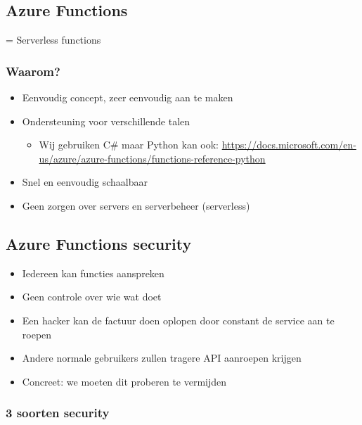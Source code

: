 \documentclass{article}
\begin{document}
\subsection{Azure Functions}
= Serverless functions 

\subsubsection{Waarom?}
\begin{itemize}
    \item Eenvoudig concept, zeer eenvoudig aan te maken
    \item Ondersteuning voor verschillende talen
    \begin{itemize}
        \item Wij gebruiken C\# maar Python kan ook: \url{https://docs.microsoft.com/en-us/azure/azure-functions/functions-reference-python}
    \end{itemize}
    \item Snel en eenvoudig schaalbaar
    \item Geen zorgen over servers en serverbeheer (serverless)
\end{itemize}

\subsection{Azure Functions security}
\begin{itemize}
    \item Iedereen kan functies aanspreken
    \item Geen controle over wie wat doet
    \item Een hacker kan de factuur doen oplopen door constant de service aan te roepen
    \item Andere normale gebruikers zullen tragere API aanroepen krijgen
    \item Concreet: we moeten dit proberen te vermijden
\end{itemize}

\subsubsection{3 soorten security}
\end{document}
